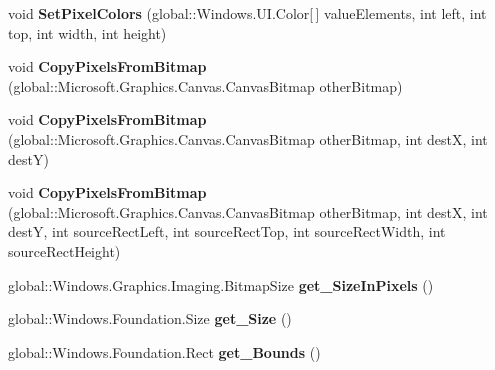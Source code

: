 \begin{DoxyCompactItemize}
void {\bfseries Set\+Pixel\+Colors} (global\+::\+Windows.\+U\+I.\+Color\mbox{[}$\,$\mbox{]} value\+Elements, int left, int top, int width, int height)
\item 
\mbox{\label{interface_microsoft_1_1_graphics_1_1_canvas_1_1_i_canvas_bitmap_a6e4c4209ff55c072d09a51c00a9d4653}} 
void {\bfseries Copy\+Pixels\+From\+Bitmap} (global\+::\+Microsoft.\+Graphics.\+Canvas.\+Canvas\+Bitmap other\+Bitmap)
\item 
\mbox{\label{interface_microsoft_1_1_graphics_1_1_canvas_1_1_i_canvas_bitmap_a5ab0cddef05eb80cffded7b872aacc34}} 
void {\bfseries Copy\+Pixels\+From\+Bitmap} (global\+::\+Microsoft.\+Graphics.\+Canvas.\+Canvas\+Bitmap other\+Bitmap, int destX, int destY)
\item 
\mbox{\label{interface_microsoft_1_1_graphics_1_1_canvas_1_1_i_canvas_bitmap_a6300f60ab1f71c5032c2680ae66ec957}} 
void {\bfseries Copy\+Pixels\+From\+Bitmap} (global\+::\+Microsoft.\+Graphics.\+Canvas.\+Canvas\+Bitmap other\+Bitmap, int destX, int destY, int source\+Rect\+Left, int source\+Rect\+Top, int source\+Rect\+Width, int source\+Rect\+Height)
\item 
\mbox{\label{interface_microsoft_1_1_graphics_1_1_canvas_1_1_i_canvas_bitmap_af2b4e8d31f7d4a3d849dc0f156a59a7e}} 
global\+::\+Windows.\+Graphics.\+Imaging.\+Bitmap\+Size {\bfseries get\+\_\+\+Size\+In\+Pixels} ()
\item 
\mbox{\label{interface_microsoft_1_1_graphics_1_1_canvas_1_1_i_canvas_bitmap_a0402608b6a37f8002b6fcc5ef95b8003}} 
global\+::\+Windows.\+Foundation.\+Size {\bfseries get\+\_\+\+Size} ()
\item 
\mbox{\label{interface_microsoft_1_1_graphics_1_1_canvas_1_1_i_canvas_bitmap_a9525b7941b7474c214ceda939e8a1f59}} 
global\+::\+Windows.\+Foundation.\+Rect {\bfseries get\+\_\+\+Bounds} ()
\item 
\mbox{\label{interface_microsoft_1_1_graphics_1_1_canvas_1_1_i_canvas_bitmap_a22ceb272a871aee9ccb6f36129c8cb25}} 

\end{DoxyCompactItemize}
